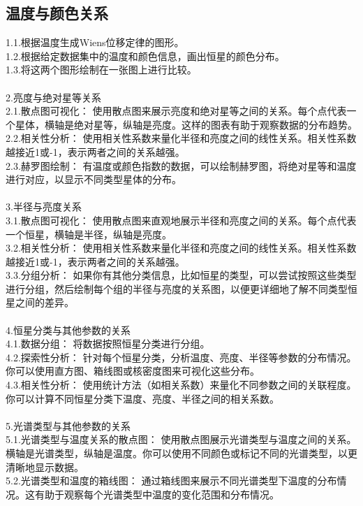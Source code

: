 \documentclass[12pt, a4paper, oneside]{article}
\begin{document}
\begin{spacing}{2.0}
\subsection{温度与颜色关系}
1.1.根据温度生成Wiens位移定律的图形。\\
1.2.根据给定数据集中的温度和颜色信息，画出恒星的颜色分布。\\
1.3.将这两个图形绘制在一张图上进行比较。\\
\\
2.亮度与绝对星等关系\\
2.1.散点图可视化： 使用散点图来展示亮度和绝对星等之间的关系。每个点代表一个星体，横轴是绝对星等，纵轴是亮度。这样的图表有助于观察数据的分布趋势。\\
2.2.相关性分析： 使用相关性系数来量化半径和亮度之间的线性关系。相关性系数越接近1或-1，表示两者之间的关系越强。\\
2.3.赫罗图绘制： 有温度或颜色指数的数据，可以绘制赫罗图，将绝对星等和温度进行对应，以显示不同类型星体的分布。\\
\\
3.半径与亮度关系\\
3.1.散点图可视化： 使用散点图来直观地展示半径和亮度之间的关系。每个点代表一个恒星，横轴是半径，纵轴是亮度。\\
3.2.相关性分析： 使用相关性系数来量化半径和亮度之间的线性关系。相关性系数越接近1或-1，表示两者之间的关系越强。\\
3.3.分组分析： 如果你有其他分类信息，比如恒星的类型，可以尝试按照这些类型进行分组，然后绘制每个组的半径与亮度的关系图，以便更详细地了解不同类型恒星之间的差异。\\
\\
4.恒星分类与其他参数的关系\\
4.1.数据分组： 将数据按照恒星分类进行分组。\\
4.2.探索性分析： 针对每个恒星分类，分析温度、亮度、半径等参数的分布情况。你可以使用直方图、箱线图或核密度图来可视化这些分布。\\
4.3.相关性分析： 使用统计方法（如相关系数）来量化不同参数之间的关联程度。你可以计算不同恒星分类下温度、亮度、半径之间的相关系数。\\
\\
5.光谱类型与其他参数的关系\\
5.1.光谱类型与温度关系的散点图： 使用散点图展示光谱类型与温度之间的关系。横轴是光谱类型，纵轴是温度。你可以使用不同颜色或标记不同的光谱类型，以更清晰地显示数据。\\
5.2.光谱类型和温度的箱线图： 通过箱线图来展示不同光谱类型下温度的分布情况。这有助于观察每个光谱类型中温度的变化范围和分布情况。\\




\end{spacing}{}
%
%
\end{document}
